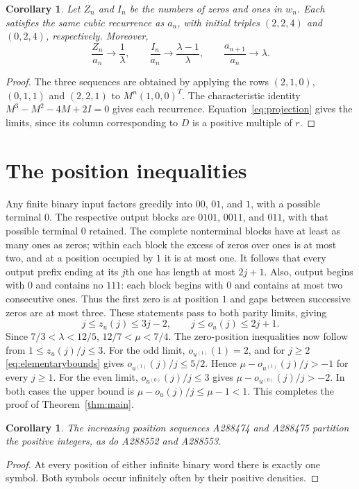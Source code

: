 \documentclass[11pt]{article}
\newtheorem{corollary}[theorem]{Corollary}
\begin{document}
\begin{corollary}\label{cor:counts}
Let $Z_n$ and $I_n$ be the numbers of zeros and ones in $w_n$.
Each satisfies the same cubic recurrence as $a_n$, with initial triples
$(2,2,4)$ and $(0,2,4)$, respectively. Moreover,
\[
\frac{Z_n}{a_n}\longrightarrow\frac1\lambda,\qquad
\frac{I_n}{a_n}\longrightarrow\frac{\lambda-1}{\lambda},\qquad
\frac{a_{n+1}}{a_n}\longrightarrow\lambda.
\]
\end{corollary}
\begin{proof}
The three sequences are obtained by applying the rows $(2,1,0)$,
$(0,1,1)$ and $(2,2,1)$ to $M^n(1,0,0)^T$.
The characteristic identity $M^3-M^2-4M+2I=0$ gives each recurrence.
Equation~\eqref{eq:projection} gives the limits, since its column
corresponding to $D$ is a positive multiple of $r$.
\end{proof}

\section{The position inequalities}
Any finite binary input factors greedily into $00$, $01$, and $1$,
with a possible terminal $0$. The respective output blocks are
$0101$, $0011$, and $011$, with that possible terminal $0$ retained.
The complete nonterminal blocks have at least as many ones as zeros;
within each block the excess of zeros over ones is at most two,
and at a position occupied by $1$ it is at most one.
It follows that every output prefix ending at its $j$th one has
length at most $2j+1$.
Also, output begins with $0$ and contains no $111$: each block begins
with $0$ and contains at most two consecutive ones. Thus the first
zero is at position $1$ and gaps between successive zeros are at most three.
These statements pass to both parity limits, giving
\begin{equation}\label{eq:elementarybounds}
j\leq z_u(j)\leq3j-2,\qquad j\leq o_u(j)\leq2j+1.
\end{equation}
Since $7/3<\lambda<12/5$,
$12/7<\mu<7/4$. The zero-position inequalities now follow from
$1\leq z_u(j)/j\leq3$.
For the odd limit, $o_{u^{(1)}}(1)=2$, and for $j\geq2$
\eqref{eq:elementarybounds} gives $o_{u^{(1)}}(j)/j\leq5/2$.
Hence $\mu-o_{u^{(1)}}(j)/j>-1$ for every $j\geq1$.
For the even limit, $o_{u^{(0)}}(j)/j\leq3$ gives
$\mu-o_{u^{(0)}}(j)/j>-2$. In both cases the upper bound is
$\mu-o_u(j)/j\leq\mu-1<1$. This completes the proof of
Theorem~\ref{thm:main}.

\begin{corollary}\label{cor:complements}
The increasing position sequences A288474 and A288475 partition the
positive integers, as do A288552 and A288553.
\end{corollary}
\begin{proof}
At every position of either infinite binary word there is exactly one
symbol. Both symbols occur infinitely often by their positive densities.
\end{proof}
\end{document}
